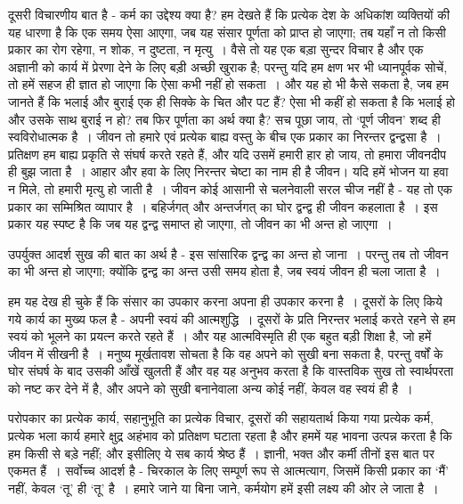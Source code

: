 दूसरी विचारणीय बात है - कर्म का उद्देश्य क्या है? हम देखते हैं कि प्रत्येक देश के अधिकांश व्यक्तियों की यह धारणा है कि एक समय ऐसा आएगा, जब यह संसार पूर्णता को प्राप्त हो जाएगा; तब यहाँ न तो किसी प्रकार का रोग रहेगा, न शोक, न दुष्टता, न मृत्यु~। वैसे तो यह एक बड़ा सुन्दर विचार है और एक अज्ञानी को कार्य में प्रेरणा देने के लिए बड़ी अच्छी खुराक है; परन्तु यदि हम क्षण भर भी ध्यानपूर्वक सोचें, तो हमें सहज ही ज्ञात हो जाएगा कि ऐसा कभी नहीं हो सकता~। और यह हो भी कैसे सकता है, जब हम जानते हैं कि भलाई और बुराई एक ही सिक्के के चित और पट हैं? ऐसा भी कहीं हो सकता है कि भलाई हो और उसके साथ बुराई न हो? तब फिर पूर्णता का अर्थ क्या है? सच पूछा जाय, तो ‘पूर्ण जीवन’ शब्द ही स्वविरोधात्मक है~। जीवन तो हमारे एवं प्रत्येक बाह्य वस्तु के बीच एक प्रकार का निरन्तर द्वन्द्वसा है~। प्रतिक्षण हम बाह्य प्रकृति से संघर्ष करते रहते हैं, और यदि उसमें हमारी हार हो जाय, तो हमारा जीवनदीप ही बुझ जाता है~। आहार और हवा के लिए निरन्तर चेष्टा का नाम ही है जीवन। यदि हमें भोजन या हवा न मिले, तो हमारी मृत्यु हो जाती है~। जीवन कोई आसानी से चलनेवाली सरल चीज नहीं है - यह तो एक प्रकार का सम्मिश्रित व्यापार है~। बहिर्जगत् और अन्तर्जगत् का घोर द्वन्द्व ही जीवन कहलाता है~। इस प्रकार यह स्पष्ट है कि जब यह द्वन्द्व समाप्त हो जाएगा, तो जीवन का भी अन्त हो जाएगा~।

\vskip 2pt

उपर्युक्त आदर्श सुख की बात का अर्थ है - इस सांसारिक द्वन्द्व का अन्त हो जाना~। परन्तु तब तो जीवन का भी अन्त हो जाएगा; क्योंकि द्वन्द्व का अन्त उसी समय होता है, जब स्वयं जीवन ही चला जाता है~।

\vskip 2pt

हम यह देख ही चुके हैं कि संसार का उपकार करना अपना ही उपकार करना है~। दूसरों के लिए किये गये कार्य का मुख्य फल है - अपनी स्वयं की आत्मशुद्धि~। दूसरों के प्रति निरन्तर भलाई करते रहने से हम स्वयं को भूलने का प्रयत्न करते रहते हैं~। और यह आत्मविस्मृति ही एक बहुत बड़ी शिक्षा है, जो हमें जीवन में सीखनी है~। मनुष्य मूर्खतावश सोचता है कि वह अपने को सुखी बना सकता है, परन्तु वर्षों के घोर संघर्ष के बाद उसकी आँखें खुलती हैं और वह यह अनुभव करता है कि वास्तविक सुख तो स्वार्थपरता को नष्ट कर देने में है, और अपने को सुखी बनानेवाला अन्य कोई नहीं, केवल वह स्वयं ही है~।

\vskip 2pt

परोपकार का प्रत्येक कार्य, सहानुभूति का प्रत्येक विचार, दूसरों की सहायतार्थ किया गया प्रत्येक कर्म, प्रत्येक भला कार्य हमारे क्षुद्र अहंभाव को प्रतिक्षण घटाता रहता है और हममें यह भावना उत्पन्न करता है कि हम किसी से बड़े नहीं; और इसीलिए ये सब कार्य श्रेष्ठ हैं~। ज्ञानी, भक्त और कर्मी तीनों इस बात पर एकमत हैं~। सर्वोच्च आदर्श है - चिरकाल के लिए सम्पूर्ण रूप से आत्मत्याग, जिसमें किसी प्रकार का ‘मैं’ नहीं, केवल ‘तू’ ही ‘तू’ है~। हमारे जाने या बिना जाने, कर्मयोग हमें इसी लक्ष्य की ओर ले जाता है~।

